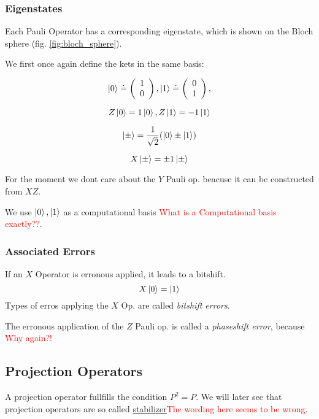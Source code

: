 \subsubsection{Eigenstates}
Each Pauli Operator has a corresponding eigenstate, which is shown on the Bloch sphere (fig. \ref{fig:bloch_sphere}).

We first once again define the kets in the same basis:

\begin{equation}
   \ket{0}  \doteq  \left(\begin{array}{c} 1 \\ 0 \end{array}\right), \ket{1} \doteq \left(\begin{array}{c} 0 \\ 1 \end{array}\right),
\end{equation}

\begin{equation}
    Z \ket{0} = 1 \ket{0}, Z \ket{1} = -1 \ket{1}
\end{equation}

\begin{equation}
    \ket{\pm}  =  \frac{1}{\sqrt{2}}( \ket{0} \pm  \ket{1}) 
\end{equation}

\begin{equation}
   X \ket{\pm} = \pm1 \ket{\pm} 
\end{equation}

For the moment we dont care about the $Y$ Pauli op. beacuse it can be constructed from $XZ$.

We use $\ket{0},\ket{1}$ as a computational basis \textcolor{red}{What is a Computational basis exactly??}. 


\subsubsection{Associated Errors}
If an $X$ Operator is erronous applied, it leads to a bitshift. 
\begin{equation}
    X\ket{0} = \ket{1}
\end{equation}
Types of erros applying the $X$ Op. are called \textit{bitshift errors}.

The erronous application of the $Z$ Pauli op. is called a \textit{phaseshift error}, because 
\textcolor{red}{Why again?!}


\subsection{Projection Operators}\label{sec:basic.math.projection_operator}
A projection operator fullfills the condition $P^2=P$.
We will later see that projection operators are so called \hyperref[sec:basic.qc.stabilizer]{stabilizer}\textcolor{red}{The wording here seems to be wrong}.


